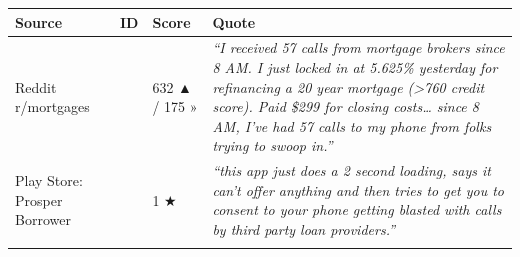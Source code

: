 \documentclass[
  10pt,
]{article}
\let\origtexttt\texttt
\renewcommand{\texttt}[1]{\origtexttt{\seqsplit{#1}}}
\begin{document}
\begin{longtable}[]{@{}llll@{}}
\toprule
\begin{minipage}[b]{0.20\columnwidth}\raggedright
Source\strut
\end{minipage} & \begin{minipage}[b]{0.14\columnwidth}\raggedright
ID\strut
\end{minipage} & \begin{minipage}[b]{0.10\columnwidth}\raggedright
Score\strut
\end{minipage} & \begin{minipage}[b]{0.44\columnwidth}\raggedright
Quote\strut
\end{minipage}\tabularnewline
\midrule
\endhead
\begin{minipage}[t]{0.20\columnwidth}\raggedright
Reddit r/mortgages\strut
\end{minipage} & \begin{minipage}[t]{0.14\columnwidth}\raggedright
\texttt{1odky4x}\strut
\end{minipage} & \begin{minipage}[t]{0.10\columnwidth}\raggedright
632 ▲ / 175 »\strut
\end{minipage} & \begin{minipage}[t]{0.44\columnwidth}\raggedright
\emph{``I received 57 calls from mortgage brokers since 8 AM. I just locked in at 5.625\% yesterday
for refinancing a 20 year mortgage (\textgreater760 credit score). Paid \$299 for closing
costs\ldots{} since 8 AM, I've had 57 calls to my phone from folks trying to swoop in.''}\strut
\end{minipage}\tabularnewline
\begin{minipage}[t]{0.20\columnwidth}\raggedright
Play Store: Prosper Borrower\strut
\end{minipage} & \begin{minipage}[t]{0.14\columnwidth}\raggedright
\texttt{playstore\_8349f9d2-\ldots{}-55bbb0db9150}\strut
\end{minipage} & \begin{minipage}[t]{0.10\columnwidth}\raggedright
1 ★\strut
\end{minipage} & \begin{minipage}[t]{0.44\columnwidth}\raggedright
\emph{``this app just does a 2 second loading, says it can't offer anything and then tries to get
you to consent to your phone getting blasted with calls by third party loan providers.''}\strut
\end{minipage}\tabularnewline
\begin{minipage}[t]{0.20\columnwidth}\raggedright

\end{minipage}
\end{longtable}
\end{document}
